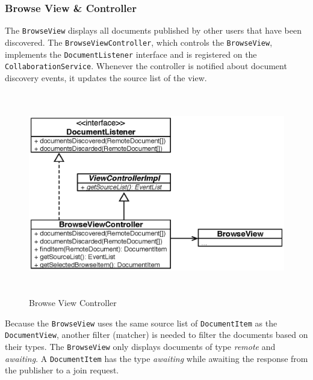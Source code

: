
\subsubsection{Browse View \& Controller}
The \texttt{Browse\-View} displays all documents published by other users that have been discovered. The \texttt{Browse\-View\-Controller}, which controls the \texttt{Browse\-View}, implements the \texttt{Document\-Listener} interface and is registered on the \texttt{Collaboration\-Service}. Whenever the controller is notified about document discovery events, it updates the source list of the view.

\begin{figure}[H]
\begin{center}
  \includegraphics[height=3.5in, width=5.62in]{../images/finalreport/application_browseview.eps}
\caption{Browse View Controller}
\label{application_browseview}
\end{center}
\end{figure}

Because the \texttt{Browse\-View} uses the same source list of \texttt{Document\-Item} as the \texttt{Document\-View}, another filter (matcher) is needed to filter the documents based on their types. The \texttt{Browse\-View} only displays documents of type \emph{remote} and \emph{awaiting}. A \texttt{Document\-Item} has the type \emph{awaiting} while awaiting the response from the publisher to a join request.

